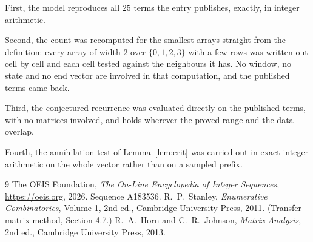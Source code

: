 \documentclass[11pt,a4paper]{article}
\theoremstyle{plain}
\theoremstyle{definition}
\begin{document}
First, the model reproduces all $25$ terms the entry publishes, exactly, in integer
arithmetic.

Second, the count was recomputed for the smallest arrays straight from the definition: every
array of width $2$ over $\{0,1,2,3\}$ with a few rows was written out cell by cell and each cell
tested against the neighbours it has. No window, no state and no end vector are involved in that
computation, and the published terms came back.

Third, the conjectured recurrence was evaluated directly on the published terms, with no
matrices involved, and holds wherever the proved range and the data overlap.

Fourth, the annihilation test of Lemma~\ref{lem:crit} was carried out in exact integer
arithmetic on the whole vector rather than on a sampled prefix.

\begin{thebibliography}{9}
 The OEIS Foundation, \emph{The On-Line Encyclopedia of Integer
Sequences}, \url{https://oeis.org}, 2026. Sequence A183536.
 R.~P.~Stanley, \emph{Enumerative Combinatorics}, Volume 1, 2nd ed.,
Cambridge University Press, 2011. (Transfer-matrix method, Section 4.7.)
 R.~A.~Horn and C.~R.~Johnson, \emph{Matrix Analysis}, 2nd ed., Cambridge
University Press, 2013.
\end{thebibliography}
\end{document}
